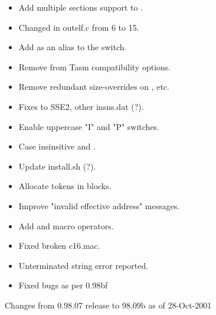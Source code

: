 
\begin{itemize}
    \item{Add multiple sections support to .}
    \item{Changed  in outelf.c from 6 to 15.}
    \item{Add  as an alias to the  switch.}
    \item{Remove  from Tasm compatibility options.}
    \item{Remove redundant size-overrides on , etc.}
    \item{Fixes to SSE2, other insns.dat (?).}
    \item{Enable uppercase "I" and "P" switches.}
    \item{Case insinsitive  and .}
    \item{Update install.sh (?).}
    \item{Allocate tokens in blocks.}
    \item{Improve "invalid effective address" messages.}
\end{itemize}


\begin{itemize}
    \item{Add  and  macro operators.}
    \item{Fixed broken c16.mac.}
    \item{Unterminated string error reported.}
    \item{Fixed bugs as per 0.98bf}
\end{itemize}


Changes from 0.98.07 release to 98.09b as of 28-Oct-2001

